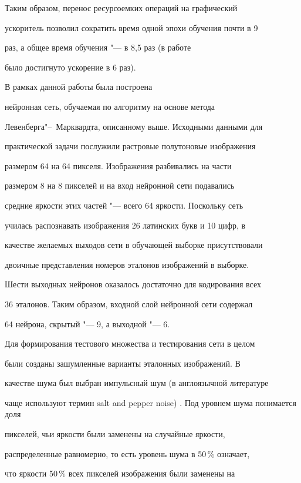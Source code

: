 Таким образом, перенос ресурсоемких операций на графический

ускоритель позволил сократить время одной эпохи обучения почти в 9

раз, а общее время обучения "--- в 8,5 раз (в работе

\cite{afertsev:Izotov} было достигнуто ускорение в 6 раз).



\smallskip



 В рамках данной работы была построена

нейронная сеть, обучаемая по алгоритму на основе метода

Левенберга"--~Марквардта, описанному выше. Исходными данными для

практической задачи послужили растровые полутоновые изображения

размером 64 на 64 пикселя. Изображения разбивались на части

размером 8 на 8 пикселей и на вход нейронной сети подавались

средние яркости этих частей "--- всего 64 яркости. Поскольку сеть

училась распознавать изображения 26 латинских букв и 10 цифр, в

качестве желаемых выходов сети в обучающей выборке присутствовали

двоичные представления номеров эталонов изображений в выборке.

Шести выходных нейронов оказалось достаточно для кодирования всех

36 эталонов. Таким образом, входной слой нейронной сети содержал

64 нейрона, скрытый "--- 9, а выходной "--- 6.



Для формирования тестового множества и тестирования сети в целом

были созданы зашумленные варианты эталонных изображений. В

качестве шума был выбран импульсный шум (в англоязычной литературе

чаще используют термин salt and pepper noise) \cite{afertsev:Gonzalez}. Под уровнем шума понимается доля

пикселей, чьи яркости были заменены на случайные яркости,

распределенные равномерно, то есть уровень шума в 50\,\% означает,

что яркости 50\,\% всех пикселей изображения были заменены на

